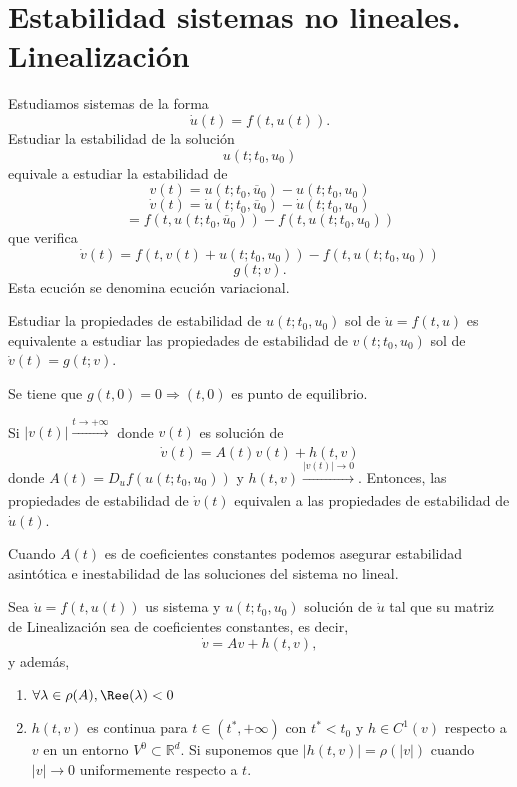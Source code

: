 \section{Estabilidad sistemas no lineales. Linealización}

\begin{note}
  Estudiamos sistemas de la forma 
  \[ 
    \dot{u}(t) = f(t, u(t)) .
  \] 
  Estudiar la estabilidad de la solución
  \[ 
    u(t; t_0, u_0) 
  \] 
  equivale a estudiar la estabilidad de
  \[ 
    v(t) = u(t; t_0, \overline{u}_{0}) - u(t; t_0, u_0)
  \] 
  \[ 
     
    \dot{v}(t) = \dot{u}(t; t_0, \overline{u}_{0}) - \dot{u}(t; t_0, u_0)
  \] 
  \[ 
    = f(t, u(t; t_0, \overline{u}_{0})) - f(t, u(t; t_0, {u}_{0}))
  \] 
  que verifica
  \[  
    \dot{v}(t) = f(t, v(t) + u(t; t_0, {u}_{0})) - f(t, u(t; t_0, {u}_{0}))
  \] 
  \[ 
    g(t; v) .
  \] 
  Esta ecución se denomina ecución variacional.
\end{note}

\begin{prop}
  Estudiar la propiedades de estabilidad de $u(t; t_0, u_0)$ sol de $\dot{u} = f(t, u)$ es equivalente a estudiar las propiedades de estabilidad de $v(t; t_0, u_0)$ sol de $\dot{v}(t) = g(t; v)$.
\end{prop}

\begin{obs}
  Se tiene que $g(t, 0) = 0 \Rightarrow (t,0)$ es punto de equilibrio.
\end{obs}

\begin{prop}
  Si $| v(t) | \xrightarrow[]{ t \rightarrow +\infty }$ donde $v(t)$ es solución de
  \[ 
    \dot{v}(t) = A(t) v(t) + h(t, v) 
  \] 
  donde $A(t) = D_{u}f(u(t; t_0, u_0))$ y $h(t, v) \xrightarrow[]{ | v(t) | \rightarrow 0 }$. Entonces, las propiedades de estabilidad de $\dot{v}(t)$ equivalen a las propiedades de estabilidad de $\dot{u}(t)$.
\end{prop}

\begin{note}
  Cuando $A(t)$ es de coeficientes constantes podemos asegurar estabilidad asintótica e inestabilidad de las soluciones del sistema no lineal.
\end{note}

\begin{theo}
  Sea $\dot{u} = f(t, u(t))$ us sistema y $ u(t; t_0, u_0)$ solución de $\dot{u}$ tal que su matriz de Linealización sea de coeficientes constantes, es decir, 
  \[ 
    \dot{v} = Av + h(t, v),
  \] 
 y además, 
 \begin{enumerate}[label=(\roman*)]
  \item $\forall \lambda \in \rho(A), \Ree(\lambda) < 0$
  \item $h(t, v) $ es continua para $t \in (t^{*}, +\infty)$ con $t^{*} < t_{0}$ y $h \in C^{1}(v)$ respecto a $v$ en un entorno $V^{0} \subset \mathbb{R}^{d}$. Si suponemos que $| h(t, v) | = \rho(| v |)$ cuando $| v | \rightarrow 0$ uniformemente respecto a $t$.
 \end{enumerate}
\end{theo}
